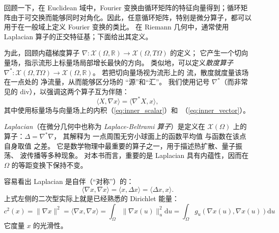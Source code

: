 回顾一下，在 Euclidean 域中，Fourier 变换由循环矩阵的特征向量得到；循环矩阵由于可交换而能够同时对角化。因此，任意循环矩阵，特别是微分算子，都可以用于在一般域上定义 Fourier 变换的类比。
%
在 Riemann 几何中，通常使用 Laplacian 算子的正交特征基；下面给出其定义。


为此，回顾内蕴梯度算子 $\nabla : \mathcal{X}(\Omega,\mathbb{R}) \rightarrow \mathcal{X}(\Omega,T\Omega)$ 的定义；
它产生一个切向量场，指示流形上标量场局部增长最快的方向。
%
类似地，可以定义{\em 散度算子} $\nabla^* : \mathcal{X}(\Omega,T\Omega) \rightarrow \mathcal{X}(\Omega,\mathbb{R})$。
%
若把切向量场视为流形上的
流，散度就度量该场在一点处的
净流量，从而能够区分场的
“源”和“汇”。
%
我们使用记号 $\nabla^*$（而非常见的 $\mathrm{div}$），以强调这两个算子互为伴随：
$$
\langle X, \nabla x\rangle = \langle \nabla^* X,  x\rangle,
$$
其中使用标量场与向量场上的内积（\ref{eq:inner_scalar}）和~（\ref{eq:inner_vector}）。

{\em Laplacian}（在微分几何中也称为 {\em Laplace-Beltrami 算子}）是定义在 $\mathcal{X}(\Omega)$ 上的算子：$\Delta = \nabla^* \nabla$，
%
其解释为
一点周围无穷小球面上的函数平均值
与函数在该点自身取值
之差。
%
%
它是数学物理中最重要的算子之一，用于描述热扩散、量子振荡、
波传播等多种现象。
%
对本书而言，重要的是 Laplacian 具有内蕴性，因而在 $\Omega$ 的等距变换下保持不变。



容易看出 Laplacian 是自伴（“对称”）的：
$$
\langle \nabla x, \nabla x \rangle = \langle x , \Delta x\rangle = \langle \Delta x ,  x\rangle.
$$
上式左侧的二次型实际上就是已经熟悉的 Dirichlet 能量：
$$c^2(x) = \| \nabla x \|^2 = \langle \nabla x, \nabla x \rangle = \int_\Omega \| \nabla x(u) \|_u^2 \mathrm{d}u = \int_\Omega g_u( \nabla x(u),  \nabla x(u)) \mathrm{d}u
$$
它度量 $x$ 的光滑性。
%
%
%
%
%
%



